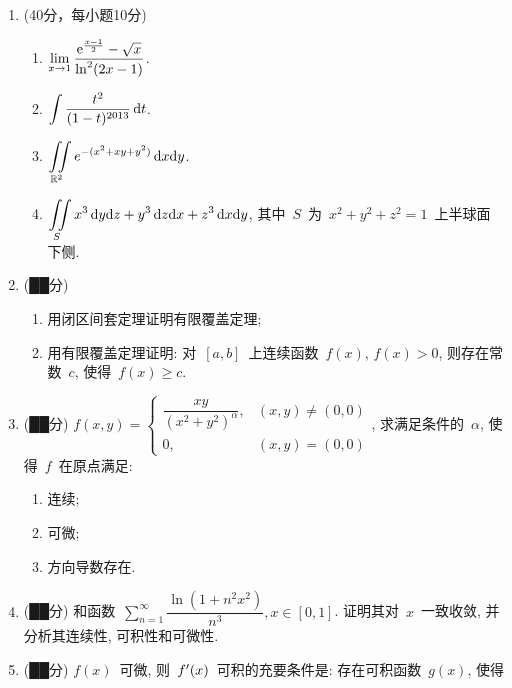 \documentclass[UTF8,a4paper,11pt]{article}
\begin{document}
\begin{enumerate}
	\item (40分，每小题10分)
	      \begin{enumerate}
		      \item $\lim\limits_{x\to 1}\dfrac{\mathrm{e}^{\frac{x-1}{2}}-\sqrt{x}}{\ln^2(2x-1)}$.
		            \vspace{2em}
		      \item $\displaystyle\int\dfrac{t^2}{(1-t)^{2013}}\,\mathrm{d}t$.
		            \vspace{2em}
		      \item $\displaystyle\iint\limits_{\mathbb{R}^2} e^{-(x^2+xy+y^2)}\,\mathrm{d}x\mathrm{d}y$.
		            \vspace{2em}
		      \item $\displaystyle\iint\limits_{S} x^3\,\mathrm{d}y\mathrm{d}z+y^3\,\mathrm{d}z\mathrm{d}x+z^3\,\mathrm{d}x\mathrm{d}y$, 其中~$S$~为~$x^2+y^2+z^2=1$~上半球面下侧.
		            \vspace{2em}
	      \end{enumerate}
	\item (██分)
	      \begin{enumerate}
		      \item 用闭区间套定理证明有限覆盖定理;
		      \item 用有限覆盖定理证明: 对~$[a,b]$~上连续函数~$f(x)$, $f(x)>0$, 则存在常数~$c$, 使得~$f(x)\geqslant c$.
	      \end{enumerate}
	      \vspace{2em}
	\item (██分) $f(x,y)=\begin{cases}\dfrac{xy}{(x^2+y^2)^{\alpha}}, & (x,y)\neq(0,0)\\ 0, & (x,y)=(0,0)\end{cases}$, 求满足条件的~$\alpha$, 使得~$f$~在原点满足:
	      \begin{enumerate}
		      \item 连续;
		      \item 可微;
		      \item 方向导数存在.
	      \end{enumerate}
	      \vspace{2em}
	\item (██分) 和函数~$\sum\limits_{n=1}^{\infty}\dfrac{\ln(1+n^2x^2)}{n^3}, x\in[0,1]$. 证明其对~$x$~一致收敛, 并分析其连续性, 可积性和可微性.
	      \vspace{2em}
	\item (██分) $f(x)$~可微, 则~$f\rq{}(x)$~可积的充要条件是: 存在可积函数~$g(x)$, 使得

\end{enumerate}
\end{document}
